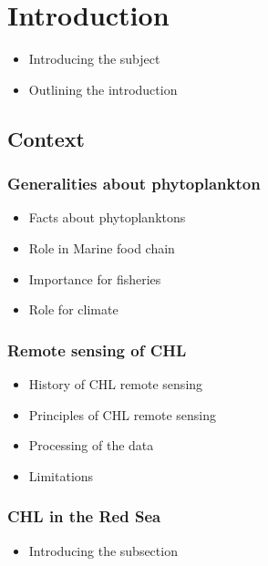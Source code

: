 

\chapter{Introduction}

\begin{itemize}
	\item Introducing the subject
	\item Outlining the introduction
\end{itemize}

\section{Context}

	\subsection{Generalities about phytoplankton}

		\begin{itemize}
			\item Facts about phytoplanktons
			\item Role in Marine food chain
			\item Importance for fisheries
			\item Role for climate
		\end{itemize}

	\subsection{Remote sensing of CHL}

		\begin{itemize}
	      	\item History of CHL remote sensing
	      	\item Principles of CHL remote sensing
	      	\item Processing of the data
	      	\item Limitations			
		\end{itemize}

	\subsection{CHL in the Red Sea}

		\begin{itemize}
			\item Introducing the subsection
		\end{itemize}

